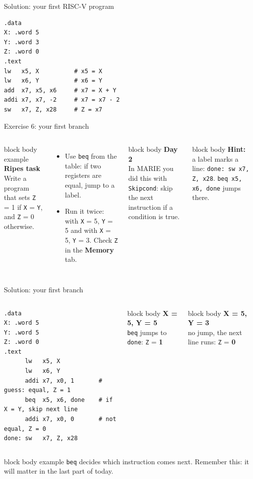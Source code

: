 \documentclass[aspectratio=169,10pt]{beamer}
\newcommand{\stepbox}[2]{%
  \begin{beamercolorbox}[rounded=true,sep=0.09cm,wd=\linewidth]{block body}
    \footnotesize\textbf{#1}\\ #2
  \end{beamercolorbox}\vspace{0.06cm}}
\newcommand{\taskhead}[2]{%
  \begin{beamercolorbox}[rounded=true,sep=0.12cm,wd=\linewidth]{block body example}
    \small\textbf{#1}\\[0.04cm]
    \footnotesize #2
  \end{beamercolorbox}\vspace{0.1cm}}
\newcommand{\keymsg}[1]{%
  \begin{beamercolorbox}[rounded=true,sep=0.1cm,wd=\textwidth]{block body example}
    \centering\footnotesize #1
  \end{beamercolorbox}}
\begin{document}
\begin{frame}[fragile]{Solution: your first RISC-V program}
  \begin{center}
    \begin{minipage}{0.55\textwidth}
\begin{lstlisting}[style=rv]
.data
X: .word 5
Y: .word 3
Z: .word 0
.text
lw   x5, X          # x5 = X
lw   x6, Y          # x6 = Y
add  x7, x5, x6     # x7 = X + Y
addi x7, x7, -2     # x7 = x7 - 2
sw   x7, Z, x28     # Z = x7
\end{lstlisting}
    \end{minipage}
  \end{center}
\end{frame}

\begin{frame}[fragile]{Exercise 6: your first branch}
  \begin{columns}[T,onlytextwidth]
      \taskhead{Ripes task}{Write a program that sets \texttt{Z} = 1 if \texttt{X} = \texttt{Y},
        and \texttt{Z} = 0 otherwise.}
      \footnotesize
      \begin{itemize}\setlength{\itemsep}{4pt}
        \item Use \texttt{beq} from the table: if two registers are equal, jump to a label.
        \item Run it twice: with \texttt{X} = 5, \texttt{Y} = 5 and with \texttt{X} = 5, \texttt{Y} = 3.
          Check \texttt{Z} in the \textbf{Memory} tab.
      \end{itemize}
      \stepbox{Day 2}{In MARIE you did this with \texttt{Skipcond}: skip the next instruction if a condition is true.}
      \begin{beamercolorbox}[rounded=true,sep=0.1cm,wd=\linewidth]{block body}
        \scriptsize\textbf{Hint:} a label marks a line: \texttt{done: sw x7, Z, x28}.
        \texttt{beq x5, x6, done} jumps there.
      \end{beamercolorbox}
  \end{columns}
\end{frame}

\begin{frame}[fragile]{Solution: your first branch}
  \begin{columns}[c,onlytextwidth]
\begin{lstlisting}[style=rv]
.data
X: .word 5
Y: .word 5
Z: .word 0
.text
      lw   x5, X
      lw   x6, Y
      addi x7, x0, 1       # guess: equal, Z = 1
      beq  x5, x6, done    # if X = Y, skip next line
      addi x7, x0, 0       # not equal, Z = 0
done: sw   x7, Z, x28
\end{lstlisting}
      \stepbox{X = 5, Y = 5}{\texttt{beq} jumps to \texttt{done}: \texttt{Z} = \textbf{1}}
      \stepbox{X = 5, Y = 3}{no jump, the next line runs: \texttt{Z} = \textbf{0}}
  \end{columns}
  \vfill
  \keymsg{\texttt{beq} decides which instruction comes next. Remember this: it will matter in the last part of today.}
\end{frame}
\end{document}
